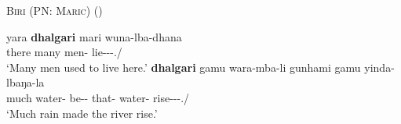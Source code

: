\documentclass[12pt,egregdoesnotlikesansseriftitles]{scrartcl}
\begin{document}

\begin{exe}
  \ex \textsc{Biri (PN: Maric}) \hfill(\cite[54]{terrill98}) \label{manymuch1}
  \begin{xlist} 
    \ex \gll  yara    \textbf{dhalgari} mari  wuna-lba-dhana \\
    there  many    men-\Abs{} lie-\Cont-\Pst-\Tpl.\Sarg/\Aarg\\
    \glt `Many men used to live here.'
    \ex \gll \textbf{dhalgari} gamu wara-mba-li gunhami gamu yinda-lbaŋa-la\\
    much  water-\Abs{} be-\Caus-\Pst{} that-\Abs{}  water-\Abs{}  rise-\Cont-\Prs-\Tsg.\Sarg/\Aarg\\
    \glt `Much rain made the river rise.'
  \end{xlist}
\end{exe}
\end{document}
